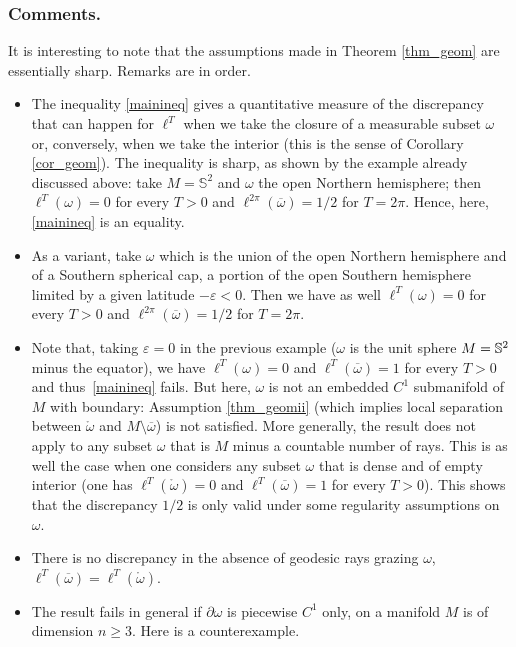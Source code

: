 \documentclass[JEP,XML,SOM,Unicode, NoEqCountersInSection,NoFloatCountersInSection,published]{cedram}
\theoremstyle{definition}
\begin{document}
\subsubsection*{Comments.}
It is interesting to note that the assumptions made in Theorem \ref{thm_geom} are essentially sharp. Remarks are in order.
\begin{itemize}
\item The inequality \eqref{mainineq} gives a quantitative measure of the discrepancy that can happen for $\ell^T$ when we take the closure of a measurable subset $\omega$ or, conversely, when we take the interior (this is the sense of Corollary \ref{cor_geom}). The inequality is sharp, as shown by the example already discussed above: take $M=\mathbb{S}^2$ and $\omega$ the open Northern hemisphere; then $\ell^T(\omega)=0$ for every $T>0$ and $\ell^{2\pi}(\overline\omega)=1/2$ for $T=2\pi$. Hence, here, \eqref{mainineq} is an equality.

\item
As a variant, take $\omega$ which is the union of the open Northern hemisphere and of a Southern spherical cap, \ie a portion of the open Southern hemisphere limited by a given latitude $-\varepsilon<0$. Then we have as well $\ell^T(\omega)=0$ for every $T>0$ and $\ell^{2\pi}(\overline\omega)=1/2$ for $T=2\pi$.

\item
Note that, taking $\varepsilon=0$ in the previous example (\ie $\omega$ is the unit sphere $M=\nobreak\mathbb{S}^2$ minus the equator), we have $\ell^T(\omega)=0$ and $\ell^T(\overline\omega)=1$ for every $T>0$ and thus~\eqref{mainineq} fails. But here, $\omega$ is not an embedded $C^1$ submanifold of $M$ with \hbox{boundary}: \hbox{Assumption} \eqref{thm_geomii} (which implies local separation between $\mathring{\omega}$ and $M\setminus\overline\omega$) is not satisfied. More generally, the result does not apply to any subset $\omega$ that is $M$ minus a countable number of rays. This is as well the case when one considers any subset $\omega$ that is dense and of empty interior (one has $\ell^T(\mathring{\omega})=0$ and $\ell^T(\overline\omega)=1$ for every $T>0$). This shows that the discrepancy $1/2$ is only valid under some regularity assumptions on $\omega$.

\item There is no discrepancy in the absence of geodesic rays grazing $\omega$, \ie $\ell^T(\overline\omega)=\ell^T(\mathring{\omega})$.

\item The result fails in general if $\partial\omega$ is piecewise $C^1$ only, on a manifold $M$ is of dimension $n\geq 3$. Here is a counterexample.


\end{itemize}
\end{document}
